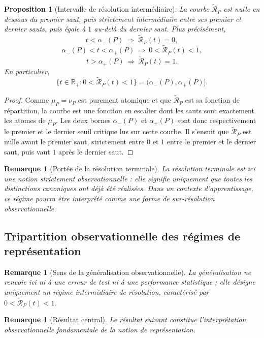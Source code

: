 \documentclass[11pt,a4paper,openany]{book}
\newtheorem{proposition}[definition]{Proposition}
\newtheorem{remark}[definition]{Remarque}
\begin{document}
\begin{proposition}[Intervalle de résolution intermédiaire]
La courbe \(\widetilde{\mathcal R}_P\) est nulle en dessous du premier saut, puis strictement intermédiaire entre ses premier et dernier sauts, puis égale à \(1\) au-delà du dernier saut. Plus précisément,
\[
t<\alpha_-(P)\ \Longrightarrow\ \widetilde{\mathcal R}_P(t)=0,
\]
\[
\alpha_-(P)<t<\alpha_+(P)\ \Longrightarrow\ 0<\widetilde{\mathcal R}_P(t)<1,
\]
\[
t>\alpha_+(P)\ \Longrightarrow\ \widetilde{\mathcal R}_P(t)=1.
\]
En particulier,
\[
\{t\in\mathbb R_+:0<\widetilde{\mathcal R}_P(t)<1\}=(\alpha_-(P),\alpha_+(P)].
\]
\end{proposition}

\begin{proof}
Comme \(\mu_P=\nu_P\) est purement atomique et que \(\widetilde{\mathcal R}_P\) est sa fonction de répartition, la courbe est une fonction en escalier dont les sauts sont exactement les atomes de \(\mu_P\). Les deux bornes \(\alpha_-(P)\) et \(\alpha_+(P)\) sont donc respectivement le premier et le dernier seuil critique lus sur cette courbe. Il s'ensuit que \(\widetilde{\mathcal R}_P\) est nulle avant le premier saut, strictement entre \(0\) et \(1\) entre le premier et le dernier saut, puis vaut \(1\) après le dernier saut.
\end{proof}

\begin{remark}[Portée de la résolution terminale]
La résolution terminale est ici une notion strictement observationnelle : elle signifie uniquement que toutes les distinctions canoniques ont déjà été réalisées. Dans un contexte d'apprentissage, ce régime pourra être interprété comme une forme de sur-résolution observationnelle.
\end{remark}

\subsection{Tripartition observationnelle des régimes de représentation}

\begin{remark}[Sens de la généralisation observationnelle]
La généralisation ne renvoie ici ni à une erreur de test ni à une performance statistique ; elle désigne uniquement un régime intermédiaire de résolution, caractérisé par \(0<\widetilde{\mathcal R}_P(t)<1\).
\end{remark}

\begin{remark}[Résultat central]
Le résultat suivant constitue l'interprétation observationnelle fondamentale de la notion de représentation.
\end{remark}
\end{document}
